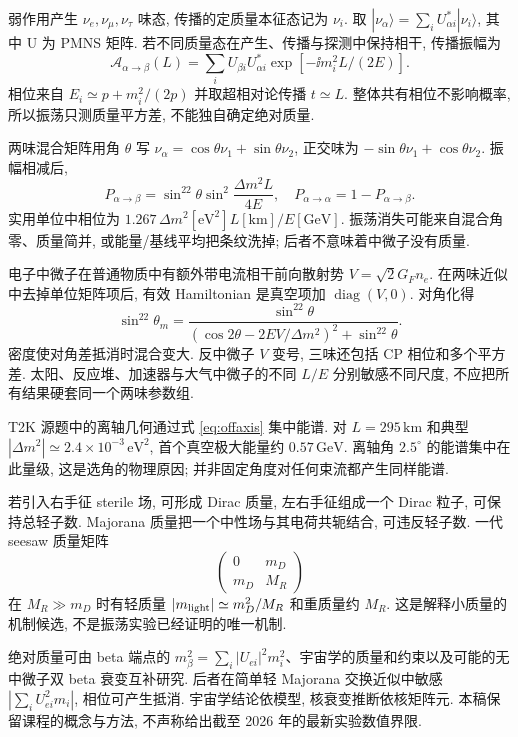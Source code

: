 \label{ch:neutrino}
弱作用产生 $\nu_e,\nu_\mu,\nu_\tau$ 味态, 传播的定质量本征态记为 $\nu_i$. 取 $|\nu_\alpha\rangle=\sum_iU_{\alpha i}^*|\nu_i\rangle$, 其中 U 为 PMNS 矩阵. 若不同质量态在产生、传播与探测中保持相干, 传播振幅为
\begin{equation}
 \mathcal A_{\alpha\to\beta}(L)=\sum_iU_{\beta i}U_{\alpha i}^*
 \exp[-\ii m_i^2L/(2E)].
\end{equation}
相位来自 $E_i\simeq p+m_i^2/(2p)$ 并取超相对论传播 $t\simeq L$. 整体共有相位不影响概率, 所以振荡只测质量平方差, 不能独自确定绝对质量.

两味混合矩阵用角 $\theta$ 写 $\nu_\alpha=\cos\theta\nu_1+\sin\theta\nu_2$, 正交味为 $-\sin\theta\nu_1+\cos\theta\nu_2$. 振幅相减后,
\begin{equation}\label{eq:oscillation}
 P_{\alpha\to\beta}=\sin^22\theta\sin^2\frac{\Delta m^2L}{4E},
 \quad P_{\alpha\to\alpha}=1-P_{\alpha\to\beta}.
\end{equation}
实用单位中相位为 $1.267\,\Delta m^2[\mathrm{eV}^2]L[\mathrm{km}]/E[\mathrm{GeV}]$. 振荡消失可能来自混合角零、质量简并, 或能量/基线平均把条纹洗掉; 后者不意味着中微子没有质量.

电子中微子在普通物质中有额外带电流相干前向散射势 $V=\sqrt2G_Fn_e$. 在两味近似中去掉单位矩阵项后, 有效 Hamiltonian 是真空项加 $\operatorname{diag}(V,0)$. 对角化得
\begin{equation}
 \sin^22\theta_m=\frac{\sin^22\theta}{(\cos2\theta-2EV/\Delta m^2)^2+\sin^22\theta}.
\end{equation}
密度使对角差抵消时混合变大. 反中微子 $V$ 变号, 三味还包括 CP 相位和多个平方差. 太阳、反应堆、加速器与大气中微子的不同 $L/E$ 分别敏感不同尺度, 不应把所有结果硬套同一个两味参数组.

T2K 源题中的离轴几何通过式 \eqref{eq:offaxis} 集中能谱. 对 $L=295\,\mathrm{km}$ 和典型 $|\Delta m^2|\simeq2.4\times10^{-3}\,\mathrm{eV}^2$, 首个真空极大能量约 $0.57\,\mathrm{GeV}$. 离轴角 $2.5^\circ$ 的能谱集中在此量级, 这是选角的物理原因; 并非固定角度对任何束流都产生同样能谱.

若引入右手征 sterile 场, 可形成 Dirac 质量, 左右手征组成一个 Dirac 粒子, 可保持总轻子数. Majorana 质量把一个中性场与其电荷共轭结合, 可违反轻子数. 一代 seesaw 质量矩阵
\begin{equation}
 \begin{pmatrix}0&m_D\\m_D&M_R\end{pmatrix}
\end{equation}
在 $M_R\gg m_D$ 时有轻质量 $|m_{\rm light}|\simeq m_D^2/M_R$ 和重质量约 $M_R$. 这是解释小质量的机制候选, 不是振荡实验已经证明的唯一机制.

绝对质量可由 beta 端点的 $m_\beta^2=\sum_i|U_{ei}|^2m_i^2$、宇宙学的质量和约束以及可能的无中微子双 beta 衰变互补研究. 后者在简单轻 Majorana 交换近似中敏感 $|\sum_iU_{ei}^2m_i|$, 相位可产生抵消. 宇宙学结论依模型, 核衰变推断依核矩阵元. 本稿保留课程的概念与方法, 不声称给出截至 2026 年的最新实验数值界限.
